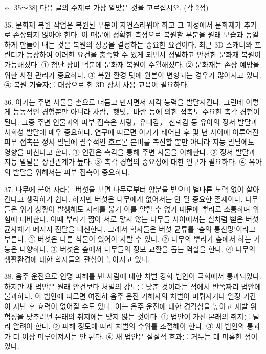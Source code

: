 \documentclass[12pt]{article}
\begin{document}
\begin{enumerate}[1.]
※ [35～38] 다음 글의 주제로 가장 알맞은 것을 고르십시오. (각 2점)

35.
  문화재 복원 작업은 복원된 부분이 자연스러워야 하고 그 과정에서
문화재가 추가로 손상되지 않아야 한다. 이 때문에 정확한 측정으로 복원할
부분을 원래 모습과 동일하게 만들어 내는 것은 복원의 성공을 결정하는
중요한 요건이다. 최근 3D 스캐너와 프린터가 등장하여 이러한 요건을
충족할 수 있게 되면서 정밀하고 안전한 문화재 복원이 가능해졌다.
① 첨단 장비 덕분에 문화재 복원이 수월해졌다.
② 문화재는 손상 예방을 위한 사전 관리가 중요하다.
③ 복원 환경 탓에 원본이 변형되는 경우가 많아지고 있다.
④ 복원 기술자를 대상으로 한 3D 장치 사용 교육이 필요하다.


36.
  아기는 주변 사물을 손으로 더듬고 만지면서 지각 능력을 발달시킨다.
그런데 이렇게 능동적인 경험뿐만 아니라 사람，햇빛，바람 등에 의한 접촉도
주요한 촉각 경험이 된다. 그중 주변 인물과의 피부 접촉은 사랑，유대감，
신뢰감 등 유아의 정서 발달과 사회성 발달에 매우 중요하다. 연구에 따르면
아기가 태어난 후 몇 년 사이에 이루어진 피부 접촉은 정서 발달에 필수적인
호르몬 분비를 촉진할 뿐만 아니라 지능 발달에도 영향을 미친다고 한다.
① 인간은 촉각을 통해 주변 사물을 이해한다.
② 정서 발달과 지능 발달은 상관관계가 높다.
③ 촉각 경험의 중요성에 대한 연구가 필요하다.
④ 유아의 발달을 위해서는 피부 접촉이 중요하다.


37.
  나무에 붙어 자라는 버섯을 보면 나무로부터 양분을 받으며 별다른 노력
없이 살아간다고 생각하기 쉽다. 하지만 버섯은 나무에게 없어서는 안 될
중요한 존재이다. 나무들은 위기 상황이 발생해도 자리를 옮겨 이를 알릴
수 없기 때문에 뿌리로 소통하며 위험에 대비한다. 이때 뿌리가 짧아 서로
닿지 않는 나무들 사이에서는 실처럼 뻗은 버섯 균사체가 메시지 전달을
대신한다. 그래서 학자들은 버섯 균류를 ‘숲의 통신망’이라고 부른다.
① 버섯은 다른 식물이 있어야 자랄 수 있다.
② 나무의 뿌리가 숲에서 하는 기능은 다양하다.
③ 버섯은 숲에서 나무들의 정보 교환을 돕는 역할을 한다.
④ 나무의 생활환경에 대한 학자들의 관심이 높아지고 있다.


38.
  음주 운전으로 인명 피해를 낸 사람에 대한 처벌 강화 법안이 국회에서
통과되었다. 하지만 새 법안은 원래 안건보다 처벌의 강도를 낮춘 것이라는
점에서 반쪽짜리 법안에 불과하다. 이 법안에 따르면 여전히 음주 운전
가해자의 처벌이 미뤄지거나 일정 기간이 지난 후 효력이 없어질 수도
있다. 이는 음주 운전에 대한 경각심을 높이고 재발 위험성을 낮추려던
본래의 취지에는 맞지 않는 것이다.
① 법안이 가진 본래의 취지를 널리 알려야 한다.
② 피해 정도에 따라 처벌의 수위를 조절해야 한다.
③ 새 법안의 통과가 더 이상 미루어져서는 안 된다.
④ 새 법안은 실질적 효과를 거두는 데 미흡한 점이 있다.





\end{enumerate}
\end{document}
